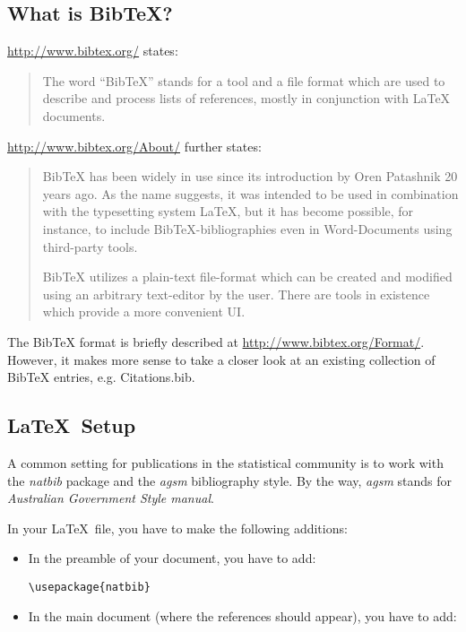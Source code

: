 \documentclass[12pt]{article}
\begin{document}
\subsection{What is BibTeX?}

\url{http://www.bibtex.org/} states:
\begin{quotation}
The word ``BibTeX'' stands for a tool and a file format which are used to describe and process lists of references, mostly in conjunction with LaTeX documents.
\end{quotation}


\noindent
\url{http://www.bibtex.org/About/} further states:
\begin{quotation}
BibTeX has been widely in use since its introduction by Oren Patashnik 20 years ago. As the name suggests, it was intended to be used in combination with the typesetting system LaTeX, but it has become possible, for instance, to include BibTeX-bibliographies even in Word-Documents using third-party tools.

BibTeX utilizes a plain-text file-format which can be created and modified using an arbitrary text-editor by the user. There are tools in existence which provide a more convenient UI.
\end{quotation}

The BibTeX format is briefly described at \url{http://www.bibtex.org/Format/}.
However, it makes more sense to take a closer look at an existing
collection of BibTeX entries, e.g.
Citations.bib.


\subsection{\LaTeX\ Setup}

A common setting for publications in the statistical community is to work
with the {\it natbib} package and the {\it agsm} bibliography style.
By the way, {\it agsm} stands for {\it Australian Government Style manual}.
 
In your \LaTeX\ file, you have to make the following additions:
\begin{itemize}

\item In the preamble of your document, you have to add:
\begin{verbatim}
\usepackage{natbib}
\end{verbatim}

\item In the main document (where the references should appear), you have to add:
\begin{verbatim}


\end{verbatim}
\end{itemize}
\end{document}
